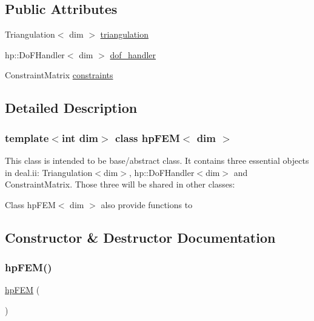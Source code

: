 \subsection*{Public Attributes}
\begin{DoxyCompactItemize}
\item 
Triangulation$<$ dim $>$ \mbox{\hyperlink{classhp_f_e_m_a1e604d1e68926caf1ebc67d2a7451783}{triangulation}}
\item 
hp\+::\+Do\+F\+Handler$<$ dim $>$ \mbox{\hyperlink{classhp_f_e_m_ab4df20fb431f370878adc06e19280d62}{dof\+\_\+handler}}
\item 
Constraint\+Matrix \mbox{\hyperlink{classhp_f_e_m_aa08dcec4445eed1687b99cdb7b24b785}{constraints}}
\end{DoxyCompactItemize}


\subsection{Detailed Description}
\subsubsection*{template$<$int dim$>$\newline
class hp\+F\+E\+M$<$ dim $>$}

This class is intended to be base/abstract class. It contains three essential objects in deal.\+ii\+: {\ttfamily Triangulation$<$dim$>$}, {\ttfamily hp\+::\+Do\+F\+Handler$<$dim$>$} and {\ttfamily Constraint\+Matrix}. Those three will be shared in other classes\+:
\begin{DoxyCode}{0}
\end{DoxyCode}
 Class hp\+F\+E\+M$<$ dim $>$ also provide functions to 

\subsection{Constructor \& Destructor Documentation}
\mbox{\label{classhp_f_e_m_ac1540fdd371c0b89a90809251b618025}} 
\subsubsection{\texorpdfstring{hpFEM()}{hpFEM()}}
{\footnotesize\ttfamily \mbox{\hyperlink{classhp_f_e_m}{hp\+F\+EM}} (\begin{DoxyParamCaption}{ }\end{DoxyParamCaption})}

